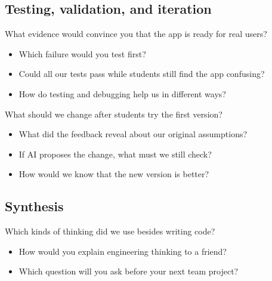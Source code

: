 \documentclass[11pt]{article}
\begin{document}
\subsection{Testing, validation, and iteration}
\begin{uncovered}[Readiness]
What evidence would convince you that the app is ready for real users?
\end{uncovered}
\begin{uncovered}
\begin{itemize}
  \item Which failure would you test first?
  \item Could all our tests pass while students still find the app confusing?
  \item How do testing and debugging help us in different ways?
\end{itemize}
\end{uncovered}
\begin{uncovered}
What should we change after students try the first version?
\end{uncovered}
\begin{uncovered}
\begin{itemize}
  \item What did the feedback reveal about our original assumptions?
  \item If AI proposes the change, what must we still check?
  \item How would we know that the new version is better?
\end{itemize}
\end{uncovered}

\subsection{Synthesis}
\begin{uncovered}
Which kinds of thinking did we use besides writing code?
\end{uncovered}
\begin{uncovered}
\begin{itemize}
  \item How would you explain engineering thinking to a friend?
  \item Which question will you ask before your next team project?
\end{itemize}
\end{uncovered}
\end{document}
